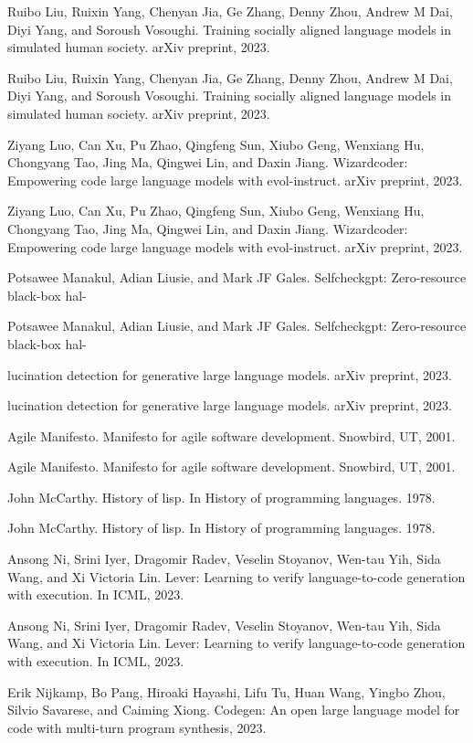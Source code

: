 \documentclass[12pt]{article}
\begin{document}
Ruibo Liu, Ruixin Yang, Chenyan Jia, Ge Zhang, Denny Zhou, Andrew M Dai, Diyi Yang, and
Soroush Vosoughi. Training socially aligned language models in simulated human society. arXiv
preprint, 2023.


Ruibo Liu, Ruixin Yang, Chenyan Jia, Ge Zhang, Denny Zhou, Andrew M Dai, Diyi Yang, and
Soroush Vosoughi. Training socially aligned language models in simulated human society. arXiv
preprint, 2023.


Ziyang Luo, Can Xu, Pu Zhao, Qingfeng Sun, Xiubo Geng, Wenxiang Hu, Chongyang Tao, Jing
Ma, Qingwei Lin, and Daxin Jiang. Wizardcoder: Empowering code large language models with
evol-instruct. arXiv preprint, 2023.


Ziyang Luo, Can Xu, Pu Zhao, Qingfeng Sun, Xiubo Geng, Wenxiang Hu, Chongyang Tao, Jing
Ma, Qingwei Lin, and Daxin Jiang. Wizardcoder: Empowering code large language models with
evol-instruct. arXiv preprint, 2023.


Potsawee Manakul, Adian Liusie, and Mark JF Gales. Selfcheckgpt: Zero-resource black-box hal-


Potsawee Manakul, Adian Liusie, and Mark JF Gales. Selfcheckgpt: Zero-resource black-box hal-


lucination detection for generative large language models. arXiv preprint, 2023.


lucination detection for generative large language models. arXiv preprint, 2023.


Agile Manifesto. Manifesto for agile software development. Snowbird, UT, 2001.


Agile Manifesto. Manifesto for agile software development. Snowbird, UT, 2001.


John McCarthy. History of lisp. In History of programming languages. 1978.


John McCarthy. History of lisp. In History of programming languages. 1978.


Ansong Ni, Srini Iyer, Dragomir Radev, Veselin Stoyanov, Wen-tau Yih, Sida Wang, and Xi Victoria
Lin. Lever: Learning to verify language-to-code generation with execution. In ICML, 2023.


Ansong Ni, Srini Iyer, Dragomir Radev, Veselin Stoyanov, Wen-tau Yih, Sida Wang, and Xi Victoria
Lin. Lever: Learning to verify language-to-code generation with execution. In ICML, 2023.


Erik Nijkamp, Bo Pang, Hiroaki Hayashi, Lifu Tu, Huan Wang, Yingbo Zhou, Silvio Savarese,
and Caiming Xiong. Codegen: An open large language model for code with multi-turn program
synthesis, 2023.
\end{document}
